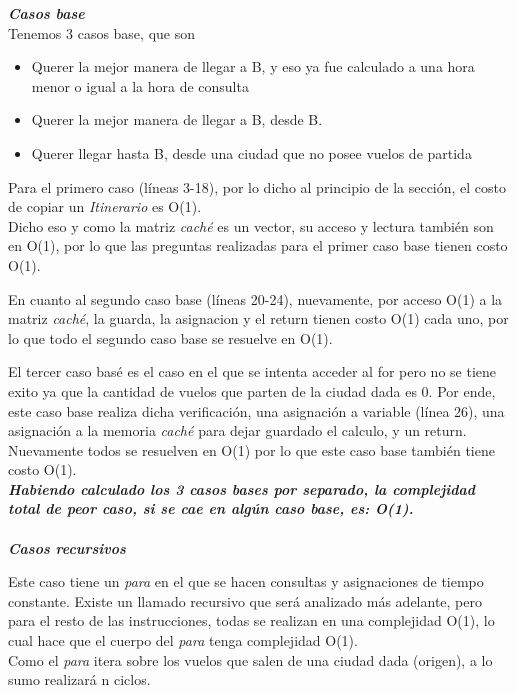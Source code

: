 \textbf{\textit{Casos base}}\\
Tenemos 3 casos base, que son
\begin{itemize}
\item Querer la mejor manera de llegar a B, y eso ya fue calculado a una hora menor o igual a la hora de consulta
\item Querer la mejor manera de llegar a B, desde B. 
\item Querer llegar hasta B, desde una ciudad que no posee vuelos de partida\\
\end{itemize}

Para el primero caso (líneas 3-18), por lo dicho al principio de la sección, el costo de copiar un \textit{Itinerario} es O(1).\\ Dicho eso y como la matriz \textit{caché} es un vector, su acceso y lectura también son en O(1), por lo que las preguntas realizadas para el primer caso base tienen costo O(1).

En cuanto al segundo caso base (líneas 20-24), nuevamente, por acceso O(1) a la matriz \textit{caché}, la guarda, la asignacion y el return tienen costo O(1) cada uno, por lo que todo el segundo caso base se resuelve en O(1).

El tercer caso basé es el caso en el que se intenta acceder al for pero no se tiene exito ya que la cantidad de vuelos que parten de la ciudad dada es 0. Por ende, este caso base realiza dicha verificación, una asignación a variable (línea 26), una asignación a la memoria \textit{caché} para dejar guardado el calculo, y un return. Nuevamente todos se resuelven en O(1) por lo que este caso base también tiene costo O(1).\\

\textbf{\textit{Habiendo calculado los 3 casos bases por separado, la complejidad total de peor caso, si se cae en algún caso base, es: O(1).}}\\ \\

\textbf{\textit{Casos recursivos}}

Este caso tiene un \textit{para} en el que se hacen consultas y asignaciones de tiempo constante. Existe un llamado recursivo que será analizado más adelante, pero para el resto de las instrucciones, todas se realizan en una complejidad O(1), lo cual hace que el cuerpo del \textit{para} tenga complejidad O(1).\\
Como el \textit{para} itera sobre los vuelos que salen de una ciudad dada (origen), a lo sumo realizará n ciclos.


